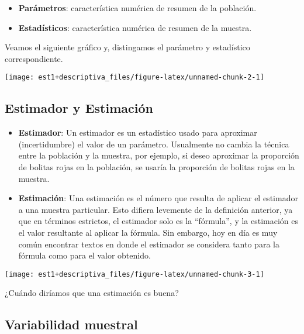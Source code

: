 \documentclass[
]{book}
\providecommand{\tightlist}{%
  \setlength{\itemsep}{0pt}\setlength{\parskip}{0pt}}
\theoremstyle{definition}
\theoremstyle{definition}
\theoremstyle{definition}
\theoremstyle{definition}
\theoremstyle{remark}
\begin{document}
\begin{itemize}
\tightlist
\item
  \textbf{Parámetros}: característica numérica de resumen de la población.
\item
  \textbf{Estadísticos}: característica numérica de resumen de la muestra.
\end{itemize}

Veamos el siguiente gráfico y, distingamos el parámetro y estadístico correspondiente.

\begin{center}\texttt{[image: est1+descriptiva\_files/figure-latex/unnamed-chunk-2-1]} \end{center}

\hypertarget{estimador-y-estimaciuxf3n}{%
\subsection*{Estimador y Estimación}\label{estimador-y-estimaciuxf3n}}

\begin{itemize}
\tightlist
\item
  \textbf{Estimador}: Un estimador es un estadístico usado para aproximar (incertidumbre) el valor de un parámetro. Usualmente no cambia la técnica entre la población y la muestra, por ejemplo, si deseo aproximar la proporción de bolitas rojas en la población, se usaría la proporción de bolitas rojas en la muestra.
\item
  \textbf{Estimación}: Una estimación es el número que resulta de aplicar el estimador a una muestra particular. Esto difiera levemente de la definición anterior, ya que en términos estrictos, el estimador solo es la ``fórmula'', y la estimación es el valor resultante al aplicar la fórmula. Sin embargo, hoy en día es muy común encontrar textos en donde el estimador se considera tanto para la fórmula como para el valor obtenido.
\end{itemize}

\begin{center}\texttt{[image: est1+descriptiva\_files/figure-latex/unnamed-chunk-3-1]} \end{center}

¿Cuándo diríamos que una estimación es buena?

\hypertarget{variabilidad-muestral}{%
\subsection*{Variabilidad muestral}\label{variabilidad-muestral}}
\end{document}
